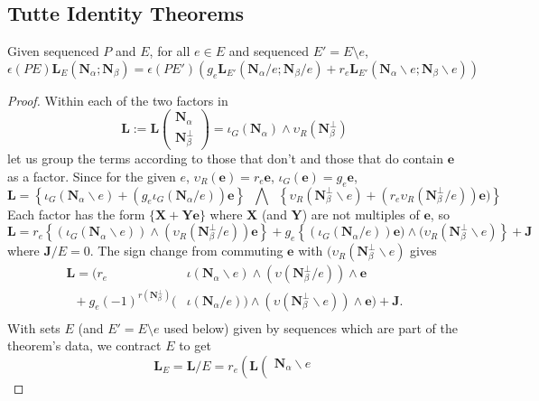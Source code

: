 \documentclass[Unicode]{cedram-alco}
\newcommand{\ext}[1]{\ensuremath{\mathbf{#1}}}
\newcommand{\eNal}{\ensuremath{\ext{N}_{\alpha}}}
\newcommand{\eNbePe}{\ensuremath{\ext{N}_{\beta}^{\perp}}}
\newcommand{\eNbe}{\ensuremath{\ext{N}_\beta}}
\newcommand{\Is}{\ensuremath{\iota}}
\newcommand{\Vs}{\ensuremath{\upsilon}}
\newcommand{\extLHorSub}[3]{\ext{L}_{#1}\left(  {#2}; {#3}  \right)}
\begin{document}
\subsection{Tutte Identity Theorems}


\begin{theo}\label{delecontrtheorem}
  Given sequenced $P$ and $E$, for all $e\in E$ and sequenced $E'=E\setminus e$,
  \begin{equation}\label{delecontrequation}
     \epsilon(PE)\extLHorSub{E}{\eNal}{\eNbe}=
      \epsilon(PE')
      \left(
      g_e\extLHorSub{E'}{\eNal/e}{\eNbe/e} +
      r_e\extLHorSub{E'}{\eNal\backslash e}{\eNbe\backslash e}\right)
  \end{equation}
\end{theo}
\begin{proof}
Within each of the two factors in
  \[
   \ext{L} := \ext{L}\left( \begin{array}{c} \eNal\\ \eNbePe \end{array} \right)
=\Is_G(\eNal)\wedge\Vs_R(\eNbePe)
  \]
let us group the terms according to those that don't and those that do
contain $\ext{e}$ as a factor.   Since for the given $e$, 
  $\Vs_R(\ext{e})=r_e\ext{e}$, $\Is_G(\ext{e})=g_e\ext{e}$,
\[
\ext{L} =
\left\{\Is_G(\eNal \backslash e) + (g_e\Is_G(\eNal/e))\ext{e}\right\}
\;\;\bigwedge\;\;
\left\{\Vs_R(\eNbePe\backslash e) + (r_e\Vs_R(\eNbePe/e))\ext{e})\right\}  
\]
Each factor has the form $\{\ext{X} + \ext{Y}\ext{e}\}$ where
$\ext{X}$ (and $\ext{Y}$) are not multiples of $\ext{e}$, so
\[
\ext{L}=
r_e\left\{ (\Is_G(\eNal\backslash e))\wedge (\Vs_R(\eNbePe/e))\ext{e} \right\}  +
g_e\left\{ (\Is_G(\eNal/e))\ext{e})  \wedge (\Vs_R(\eNbePe\backslash e)\right\}
+\ext{J}
\]
where $\ext{J}/E = 0$.
The sign change from commuting $\ext{e}$ with $(\Vs_R(\eNbePe\backslash e)$ gives
\[
\begin{split} 
   \ext{L} = \Big( r_e  \;\;\; \;\;\;\;\;\;\;\;\;\;\;\;\;\; & \Is(\eNal\backslash e)  \wedge (\Vs(\eNbePe/e))      \wedge  \ext{e} \\
   \;\;+ g_e (-1)^{r(\eNbePe)} ( & \Is(\eNal/e))\wedge(\Vs(\eNbePe\backslash e))   \wedge  \ext{e}\Big)
+\ext{J}.\\
\end{split}
\]
With sets $E$ (and $E'=E\setminus e$ used below) given by sequences
which are part of the theorem's data, we contract $E$ to get
\[
\ext{L}_E=\ext{L}/E = r_e\left(\ext{L}\left(\begin{array}{c} \eNal\backslash e \\

\end{array}\]
\end{proof}
\end{document}
